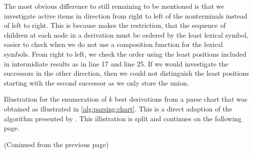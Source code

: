 \documentclass[../document.tex]{subfiles}
\begin{document}
    The most obvious difference to  still remaining to be mentioned is that we investigate active items in direction from right to left of the  nonterminals instead of left to right.
    This is because makes the restriction, that the sequence of children at each node in a  derivation must be ordered by the least lexical symbol, easier to check when we do not use a composition function for the lexical symbols.
    From right to left, we check the order using the least positions included in intermidiate results as in line 17 and line 25.
    If we would investigate the successors in the other direction, then we could not distinguish the least positions starting with the second successor as we only store the union.
    
    \begin{algorithm}
        \caption{\label{alg:parsing:deriv}
            Illustration for the enumeration of $k$ best derivations from a parse chart that was obtained as illustrated in \cref{alg:parsing:chart}.
            This is a direct adaption of the algorithm presented by \citet{HuangChiang05}.
            This illistration is split and continues on the following page.
        }
        
    \end{algorithm}
    
    \begin{algorithm}\ContinuedFloat
        \caption{
            (Coninued from the previous page)
        }
        
    \end{algorithm}
    
\end{document}
